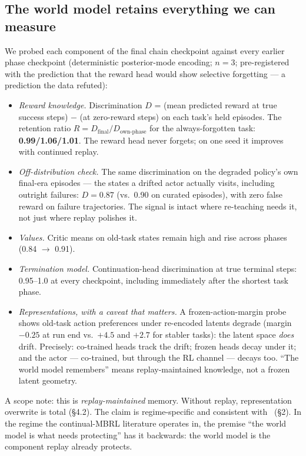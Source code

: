 \documentclass[10pt]{article}
\providecommand{\tightlist}{\setlength{\itemsep}{0pt}\setlength{\parskip}{0pt}}
\begin{document}
\subsection{The world model retains everything we can measure}
We probed each component of the final chain checkpoint against every earlier phase
checkpoint (deterministic posterior-mode encoding; $n{=}3$; pre-registered with the
prediction that the reward head would show selective forgetting --- a prediction the data
refuted):
\begin{itemize}\tightlist
\item \emph{Reward knowledge.} Discrimination $D$ = (mean predicted reward at true success
steps) $-$ (at zero-reward steps) on each task's held episodes. The retention ratio
$R = D_{\text{final}}/D_{\text{own-phase}}$ for the always-forgotten task:
\textbf{0.99/1.06/1.01}. The reward head never forgets; on one seed it improves with
continued replay.
\item \emph{Off-distribution check.} The same discrimination on the degraded policy's own
final-era episodes --- the states a drifted actor actually visits, including outright
failures: $D = 0.87$ (vs.\ 0.90 on curated episodes), with zero false reward on failure
trajectories. The signal is intact where re-teaching needs it, not just where replay
polishes it.
\item \emph{Values.} Critic means on old-task states remain high and rise across phases
(0.84 $\rightarrow$ 0.91).
\item \emph{Termination model.} Continuation-head discrimination at true terminal steps:
0.95--1.0 at every checkpoint, including immediately after the shortest task phase.
\item \emph{Representations, with a caveat that matters.} A frozen-action-margin probe
shows old-task action preferences under re-encoded latents degrade (margin $-0.25$ at run
end vs.\ $+4.5$ and $+2.7$ for stabler tasks): the latent space \emph{does} drift.
Precisely: co-trained heads track the drift; frozen heads decay under it; and the actor ---
co-trained, but through the RL channel --- decays too. ``The world model remembers'' means
replay-maintained knowledge, not a frozen latent geometry.
\end{itemize}

A scope note: this is \emph{replay-maintained} memory. Without replay, representation
overwrite is total (\S4.2). The claim is regime-specific and consistent
with~\cite{wolczyk2024fine} (\S2). In the regime the continual-MBRL literature operates in,
the premise ``the world model is what needs protecting'' has it backwards: the world model
is the component replay already protects.
\end{document}
